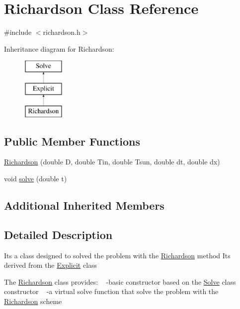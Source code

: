 \hypertarget{class_richardson}{}\section{Richardson Class Reference}
\label{class_richardson}


{\ttfamily \#include $<$richardson.\+h$>$}

Inheritance diagram for Richardson\+:\begin{figure}[H]
\begin{center}
\leavevmode
\includegraphics[height=3.000000cm]{class_richardson}
\end{center}
\end{figure}
\subsection*{Public Member Functions}
\begin{DoxyCompactItemize}
\item 
\hyperlink{class_richardson_ab669d2d69be9d899d5ca2bb7a7c33a5b}{Richardson} (double D, double Tin, double Tsun, double dt, double dx)
\item 
void \hyperlink{class_richardson_ab8dd2ff0e58c11092fead4d45a4f5c64}{solve} (double t)
\end{DoxyCompactItemize}
\subsection*{Additional Inherited Members}


\subsection{Detailed Description}
It\textquotesingle{}s a class designed to solved the problem with the \hyperlink{class_richardson}{Richardson} method It\textquotesingle{}s derived from the \hyperlink{class_explicit}{Explicit} class

The \hyperlink{class_richardson}{Richardson} class provides\+: ~\newline
-\/basic constructor based on the \hyperlink{class_solve}{Solve} class constructor ~\newline
-\/a virtual solve function that solve the problem with the \hyperlink{class_richardson}{Richardson} scheme 

